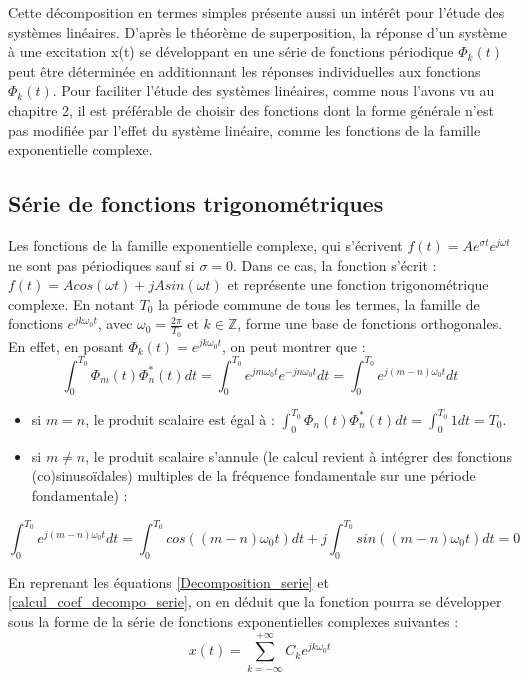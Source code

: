 	Cette décomposition en termes simples présente aussi un intérêt pour l'étude des systèmes linéaires. D'après le théorème de superposition, la réponse d'un système à une excitation x(t) se développant en une série de fonctions périodique $\Phi_{k}(t)$ peut être déterminée en additionnant les réponses individuelles aux fonctions $\Phi_{k}(t)$. Pour faciliter l'étude des systèmes linéaires, comme nous l'avons vu au chapitre 2, il est préférable de choisir des fonctions dont la forme générale n'est pas modifiée par l'effet du système linéaire, comme les fonctions de la famille exponentielle complexe.  

	
	
	\subsection{Série de fonctions trigonométriques}
	Les fonctions de la famille exponentielle complexe, qui s'écrivent $f(t)=Ae^{\sigma t}e^{j\omega t}$ ne sont pas périodiques sauf si $\sigma=0$. Dans ce cas, la fonction s'écrit : $f(t)=Acos(\omega t)+jAsin(\omega t)$ et représente une fonction trigonométrique complexe. En notant $T_{0}$ la période commune de tous les termes, la famille de fonctions $e^{jk\omega_{0} t}$, avec $\omega_{0}=\frac{2\pi}{T_{0}}$ et $k \in \mathbb{Z}$, forme une base de fonctions orthogonales. En effet, en posant $\Phi_{k}(t) = e^{jk\omega_{0}t}$, on peut montrer que : 
	\begin{equation*}
	\int_{0}^{T_{0}}\Phi_{m}(t)\Phi_{n}^{*}(t)dt=\int_{0}^{T_{0}}e^{jm\omega_{0}t}e^{-jn\omega_{0}t}dt=\int_{0}^{T_{0}}e^{j(m-n)\omega_{0}t}dt
	\end{equation*}
	\begin{itemize}
		\item si $m = n$, le produit scalaire est égal à : $\int_{0}^{T_{0}}\Phi_{n}(t)\Phi_{n}^{*}(t)dt=\int_{0}^{T_{0}}1dt=T_{0}$.
		\item si $m \neq n$, le produit scalaire s'annule (le calcul revient à intégrer des fonctions (co)sinusoïdales) multiples de la fréquence fondamentale sur une période fondamentale) :
	\end{itemize}
	\begin{equation*}
	\int_{0}^{T_{0}}e^{j(m-n)\omega_{0}t}dt=\int_{0}^{T_{0}}cos((m-n)\omega_{0}t)dt+j\int_{0}^{T_{0}}sin((m-n)\omega_{0}t)dt=0
	\end{equation*}
	
	En reprenant les équations \ref{Decomposition_serie} et \ref{calcul_coef_decompo_serie}, on en déduit que la fonction pourra se développer sous la forme de la série de fonctions exponentielles complexes suivantes :
	\begin{equation}\label{Dvpt_coef_Fourier_complexe}
	x(t)=\sum_{k=-\infty}^{+\infty}C_{k}e^{jk\omega_{0}t}
	\end{equation}
	
